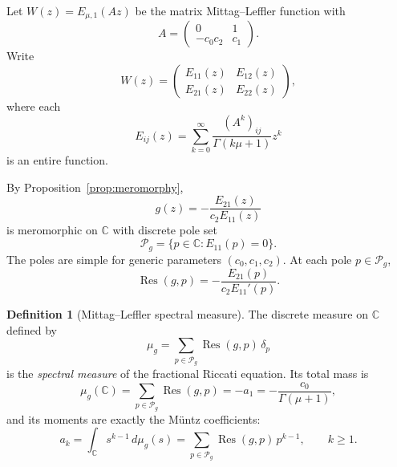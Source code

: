\documentclass[11pt]{article}
\theoremstyle{definition}
\newtheorem{definition}[theorem]{Definition}
\theoremstyle{remark}
\DeclareMathOperator{\Res}{Res}
\begin{document}
Let $W(z)=E_{\mu,1}(Az)$ be the matrix Mittag--Leffler function with
\begin{equation}
A=\begin{pmatrix}0 & 1\\ -c_{0}c_{2} & c_{1}\end{pmatrix}.
\label{eq:ml-companion}
\end{equation}
Write
\begin{equation}
W(z)=\begin{pmatrix}E_{11}(z) & E_{12}(z)\\ E_{21}(z) & E_{22}(z)\end{pmatrix},
\label{eq:ml-entries}
\end{equation}
where each
\begin{equation}
E_{ij}(z)=\sum_{k=0}^{\infty}\frac{(A^{k})_{ij}}{\Gamma(k\mu+1)}z^{k}
\label{eq:ml-entry-series}
\end{equation}
is an entire function.

By Proposition~\ref{prop:meromorphy},
\begin{equation}
g(z)=-\frac{E_{21}(z)}{c_{2}E_{11}(z)}
\label{eq:g-ml-ratio}
\end{equation}
is meromorphic on $\mathbb{C}$ with discrete pole set
\begin{equation}
\mathcal{P}_{g}=\{p\in\mathbb{C}:E_{11}(p)=0\}.
\label{eq:ml-pole-set}
\end{equation}
The poles are simple for generic parameters $(c_{0},c_{1},c_{2})$. At each pole $p\in\mathcal{P}_{g}$,
\begin{equation}
\Res(g,p)=-\frac{E_{21}(p)}{c_{2}E_{11}'(p)}.
\label{eq:ml-residue}
\end{equation}

\begin{definition}[Mittag--Leffler spectral measure]
\label{def:ml-spectral-measure}
The discrete measure on $\mathbb{C}$ defined by
\begin{equation}
\mu_{g}=\sum_{p\in\mathcal{P}_{g}}\Res(g,p)\,\delta_{p}
\label{eq:ml-spectral-measure}
\end{equation}
is the \emph{spectral measure} of the fractional Riccati equation. Its total mass is
\begin{equation}
\mu_{g}(\mathbb{C})=\sum_{p\in\mathcal{P}_{g}}\Res(g,p)=-a_{1}=-\frac{c_{0}}{\Gamma(\mu+1)},
\label{eq:ml-total-mass}
\end{equation}
and its moments are exactly the M\"untz coefficients:
\begin{equation}
a_{k}=\int_{\mathbb{C}}s^{k-1}\,d\mu_{g}(s)=\sum_{p\in\mathcal{P}_{g}}\Res(g,p)\,p^{k-1},
\qquad k\ge 1.
\label{eq:ml-moments}
\end{equation}
\end{definition}
\end{document}
